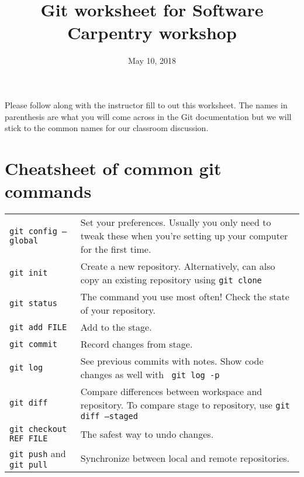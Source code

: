 \documentclass[12pt]{article}
\title{Git worksheet for Software Carpentry workshop}
\date{May 10, 2018}
\newcommand{\cbox}{\framebox{\phantom{X}}}
\newcommand{\code}[1]{\colorbox{light-gray}{\texttt{#1}}}
\begin{document}
\noindent
Please follow along with the instructor fill to out this worksheet.
The names in parenthesis are what you will come across in the Git documentation
but we will stick to the common names for our classroom discussion.
\\

\noindent
{}

\section*{Cheatsheet of common git commands}
\noindent
\begin{tabular}{ p{2.2in} | p{5in} }
  \cbox{} \code{git config --global} & Set your preferences.  Usually you only need to tweak these when you're setting up your computer for the first time. \\
  \cbox{} \code{git init} & Create a new repository.  Alternatively, can also copy an existing repository using \cbox{} \code{git clone} \\
  \cbox{} \code{git status} & The command you use most often!  Check the state of your repository. \\
  \cbox{} \code{git add FILE} & Add to the stage. \\
  \cbox{} \code{git commit} & Record changes from stage. \\
  \cbox{} \code{git log} &  See previous commits with notes. Show code changes as well with \cbox{}~\code{git log -p} \\
  \cbox{} \code{git diff} & Compare differences between workspace and repository.  To compare stage to repository, use \cbox{} \code{git diff --staged} \\
  \cbox{} \code{git checkout REF FILE} & The safest way to undo changes. \\
  \cbox{} \code{git push} and \code{git pull} & Synchronize between local and remote repositories. \\
\end{tabular}
\end{document}
